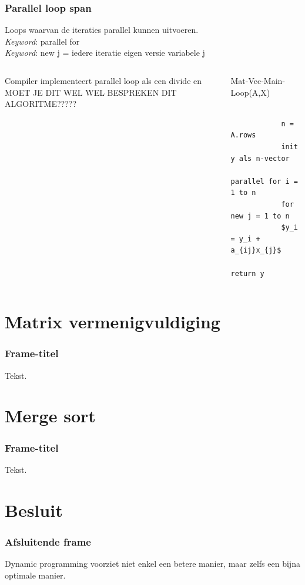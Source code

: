 \documentclass
   [kulak] %
   {kulakbeamer}
\begin{document}
\begin{frame}[fragile]
	\frametitle{Parallel loop span}
	
	Loops waarvan de iteraties parallel kunnen uitvoeren. \\ \textit{Keyword}: parallel for\\
	\textit{Keyword}: new j = iedere iteratie eigen versie variabele j
	
	
	
	\begin{columns}[T] %
		
		Compiler implementeert parallel loop als een divide en 
		MOET JE DIT WEL WEL BESPREKEN DIT ALGORITME?????
		
		\begin{column}{.3\textwidth}
			\begin{minipage}[c][.6\textheight][c]{\linewidth}
				
				
				
			\end{minipage}
		\end{column}
		
		
		
		\begin{column}{.65\textwidth}
			
			Mat-Vec-Main-Loop(A,X)
			\begin{lstlisting}[style=CStyle]
			
			n = A.rows
			init y als n-vector
			parallel for i = 1 to n
			for new j = 1 to n
			$y_i = y_i + a_{ij}x_{j}$
			return y
			\end{lstlisting}
			
		\end{column}
		
		
		
		
		
	\end{columns}
	
\end{frame}

\section[Matrix]{Matrix vermenigvuldiging}

\begin{frame}
	\frametitle{Frame-titel}
	Tekst.
\end{frame}

\section[Merge sort]{Merge sort}

\begin{frame}
	\frametitle{Frame-titel}
	Tekst.
\end{frame}

\section{Besluit}
\begin{frame}
\frametitle{Afsluitende frame}
Dynamic programming voorziet niet enkel een betere manier, maar zelfs een bijna optimale manier.
\end{frame}
\end{document}
